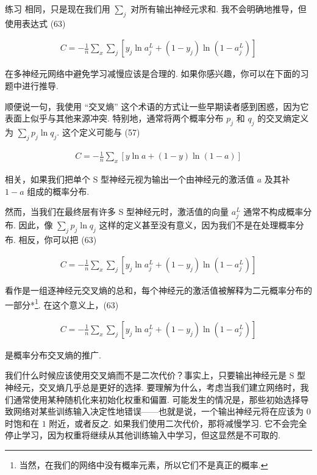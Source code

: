 \begin{exerciseBox}{练习}
\noindent 相同，只是现在我们用 $\sum_j$ 对所有输出神经元求和. 我不会明确地推导，但使用表达式 (63)

\begin{align*}
C = -\frac{1}{n} \sum_x \sum_j \left[y_j \ln a^L_j + (1-y_j) \ln (1-a^L_j) \right] \nonumber
\end{align*}

\noindent 在多神经元网络中避免学习减慢应该是合理的. 如果你感兴趣，你可以在下面的习题中进行推导.

顺便说一句，我使用 ``交叉熵'' 这个术语的方式让一些早期读者感到困惑，因为它表面上似乎与其他来源冲突. 特别地，通常将两个概率分布 $p_j$ 和 $q_j$ 的交叉熵定义为 $\sum_j p_j \ln q_j$. 这个定义可能与 (57)

\begin{align*}
C = -\frac{1}{n} \sum_x \left[y \ln a + (1-y ) \ln (1-a) \right] \nonumber
\end{align*}

\noindent 相关，如果我们把单个 S 型神经元视为输出一个由神经元的激活值 $a$ 及其补 $1-a$ 组成的概率分布.

然而，当我们在最终层有许多 S 型神经元时，激活值的向量 $a^L_j$ 通常不构成概率分布. 因此，像 $\sum_j p_j \ln q_j$ 这样的定义甚至没有意义，因为我们不是在处理概率分布. 相反，你可以把 (63)

\begin{align*}
C = -\frac{1}{n} \sum_x \sum_j \left[y_j \ln a^L_j + (1-y_j) \ln (1-a^L_j) \right] \nonumber
\end{align*}

\noindent 看作是一组逐神经元交叉熵的总和，每个神经元的激活值被解释为二元概率分布的一部分*\footnote{当然，在我们的网络中没有概率元素，所以它们不是真正的概率.}. 在这个意义上，(63)

\begin{align*}
C = -\frac{1}{n} \sum_x \sum_j \left[y_j \ln a^L_j + (1-y_j) \ln (1-a^L_j) \right] \nonumber
\end{align*}

\noindent 是概率分布交叉熵的推广.

我们什么时候应该使用交叉熵而不是二次代价？事实上，只要输出神经元是 S 型神经元，交叉熵几乎总是更好的选择. 要理解为什么，考虑当我们建立网络时，我们通常使用某种随机化来初始化权重和偏置. 可能发生的情况是，那些初始选择导致网络对某些训练输入决定性地错误——也就是说，一个输出神经元将在应该为 $0$ 时饱和在 $1$ 附近，或者反之. 如果我们使用二次代价，那将减慢学习. 它不会完全停止学习，因为权重将继续从其他训练输入中学习，但这显然是不可取的.

\end{exerciseBox}
